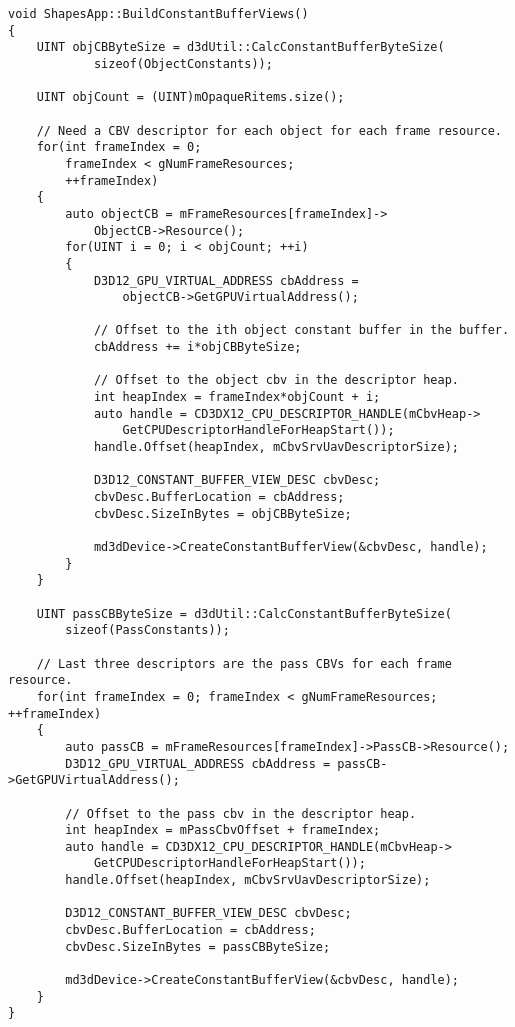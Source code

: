 \begin{lstlisting}
void ShapesApp::BuildConstantBufferViews()
{
    UINT objCBByteSize = d3dUtil::CalcConstantBufferByteSize(
            sizeof(ObjectConstants));

    UINT objCount = (UINT)mOpaqueRitems.size();

    // Need a CBV descriptor for each object for each frame resource.
    for(int frameIndex = 0; 
        frameIndex < gNumFrameResources; 
        ++frameIndex)
    {
        auto objectCB = mFrameResources[frameIndex]->
            ObjectCB->Resource();
        for(UINT i = 0; i < objCount; ++i)
        {
            D3D12_GPU_VIRTUAL_ADDRESS cbAddress = 
                objectCB->GetGPUVirtualAddress();

            // Offset to the ith object constant buffer in the buffer.
            cbAddress += i*objCBByteSize;

            // Offset to the object cbv in the descriptor heap.
            int heapIndex = frameIndex*objCount + i;
            auto handle = CD3DX12_CPU_DESCRIPTOR_HANDLE(mCbvHeap->
                GetCPUDescriptorHandleForHeapStart());
            handle.Offset(heapIndex, mCbvSrvUavDescriptorSize);

            D3D12_CONSTANT_BUFFER_VIEW_DESC cbvDesc;
            cbvDesc.BufferLocation = cbAddress;
            cbvDesc.SizeInBytes = objCBByteSize;

            md3dDevice->CreateConstantBufferView(&cbvDesc, handle);
        }
    }

    UINT passCBByteSize = d3dUtil::CalcConstantBufferByteSize(
        sizeof(PassConstants));

    // Last three descriptors are the pass CBVs for each frame resource.
    for(int frameIndex = 0; frameIndex < gNumFrameResources; ++frameIndex)
    {
        auto passCB = mFrameResources[frameIndex]->PassCB->Resource();
        D3D12_GPU_VIRTUAL_ADDRESS cbAddress = passCB->GetGPUVirtualAddress();

        // Offset to the pass cbv in the descriptor heap.
        int heapIndex = mPassCbvOffset + frameIndex;
        auto handle = CD3DX12_CPU_DESCRIPTOR_HANDLE(mCbvHeap->
            GetCPUDescriptorHandleForHeapStart());
        handle.Offset(heapIndex, mCbvSrvUavDescriptorSize);

        D3D12_CONSTANT_BUFFER_VIEW_DESC cbvDesc;
        cbvDesc.BufferLocation = cbAddress;
        cbvDesc.SizeInBytes = passCBByteSize;
        
        md3dDevice->CreateConstantBufferView(&cbvDesc, handle);
    }
}
\end{lstlisting}


